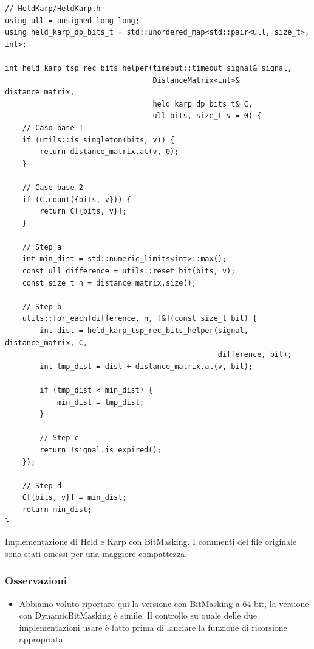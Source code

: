 \begin{listing}[!ht]
\begin{verbatim}
// HeldKarp/HeldKarp.h
using ull = unsigned long long;
using held_karp_dp_bits_t = std::unordered_map<std::pair<ull, size_t>, int>;

int held_karp_tsp_rec_bits_helper(timeout::timeout_signal& signal,
                                  DistanceMatrix<int>& distance_matrix,
                                  held_karp_dp_bits_t& C,
                                  ull bits, size_t v = 0) {
    // Caso base 1
    if (utils::is_singleton(bits, v)) {
        return distance_matrix.at(v, 0);
    }

    // Case base 2
    if (C.count({bits, v})) {
        return C[{bits, v}];
    }

    // Step a
    int min_dist = std::numeric_limits<int>::max();
    const ull difference = utils::reset_bit(bits, v);
    const size_t n = distance_matrix.size();

    // Step b
    utils::for_each(difference, n, [&](const size_t bit) {
        int dist = held_karp_tsp_rec_bits_helper(signal, distance_matrix, C,
                                                 difference, bit);
        int tmp_dist = dist + distance_matrix.at(v, bit);

        if (tmp_dist < min_dist) {
            min_dist = tmp_dist;
        }

        // Step c
        return !signal.is_expired();
    });

    // Step d
    C[{bits, v}] = min_dist;
    return min_dist;
}

\end{verbatim}
\caption{Implementazione di Held e Karp con BitMasking. I commenti del file originale sono stati omessi per una maggiore compattezza.}
\label{listing:held-karp}
\end{listing}

\subsubsection{Osservazioni}

\begin{itemize}
    \item Abbiamo voluto riportare qui la versione con BitMasking a 64 bit, la versione con DynamicBitMasking è simile. Il controllo su quale delle due implementazioni usare è fatto prima di lanciare la funzione di ricorsione appropriata.\\
\end{itemize}

